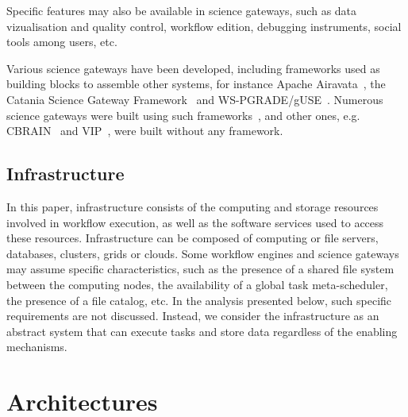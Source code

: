 \documentclass[preprint,3p,twocolumn]{elsarticle}
\begin{document}
Specific features may also be available in science gateways, such as
data vizualisation and quality control, workflow edition, debugging
instruments, social tools among users, etc.

Various science gateways have been developed, including frameworks
used as building blocks to assemble other systems, for instance Apache
Airavata~\cite{marru2011apache}, the Catania Science Gateway
Framework~\cite{Ardizzone2012} and
WS-PGRADE/gUSE~\cite{Kacsuk2012}. Numerous science gateways were built
using such frameworks~\cite{kacsuk2014science,ardizzone2012decide},
and other ones, e.g. CBRAIN~\cite{SHER-14} and VIP~\cite{GLAT-13},
were built without any framework.

\subsection{Infrastructure}

In this paper, infrastructure consists of the computing and storage
resources involved in workflow execution, as well as the software
services used to access these resources. Infrastructure can be
composed of computing or file servers, databases, clusters, grids or
clouds. Some workflow engines and science gateways may assume specific
characteristics, such as the presence of a shared file system between
the computing nodes, the availability of a global task meta-scheduler,
the presence of a file catalog, etc. In the analysis presented below,
such specific requirements are not discussed. Instead, we consider the
infrastructure as an abstract system that can execute tasks and store
data regardless of the enabling mechanisms.

\section{Architectures}
\label{sec:architectures}
\end{document}
